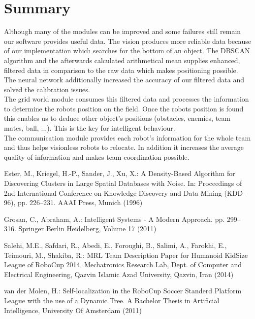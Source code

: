 \documentclass[lnicst,a4paper]{svmultln}
\begin{document}

\section{Summary}
Although many of the modules can be improved and some failures still remain our software provides useful data. The vision produces more reliable data because of our implementation which searches for the bottom of an object. The DBSCAN algorithm and the afterwards calculated arithmetical mean supplies enhanced, filtered data in comparison to the raw data which makes positioning possible. The neural network additionally increased the accuracy of our filtered data and solved the calibration issues.
\\
The grid world module consumes this filtered data and processes the information to determine the robots position on the field. Once the robots position is found this enables us to deduce other object's positions (obstacles, enemies, team mates, ball, ...). This is the key for intelligent behaviour.
\\
The communication module provides each robot's information for the whole team and thus helps visionless robots to relocate. In addition it increases the average quality of information and makes team coordination possible.





\begin{thebibliography}{5}

 Ester, M., Kriegel, H.-P., Sander, J., Xu, X.:
A Density-Based Algorithm for Discovering Clusters in Large Spatial Databases with Noise.
In: Proceedings of 2nd International Conference on Knowledge Discovery and Data Mining (KDD-96),
pp. 226--231. AAAI Press, Munich (1996)

 Grosan, C., Abraham, A.:
Intelligent Systems - A Modern Approach.
pp. 299--316. Springer Berlin Heidelberg, Volume 17 (2011)

 Salehi, M.E., Safdari, R., Abedi, E., Foroughi, B., Salimi, A., Farokhi, E., Teimouri, M., Shakiba, R.: MRL Team Description Paper for Humanoid KidSize League of RoboCup 2014. 
Mechatronics Research Lab, Dept. of Computer and Electrical Engineering,
Qazvin Islamic Azad University, Qazvin, Iran (2014)

 van der Molen, H.: Self-localization in the RoboCup Soccer Standerd Platform League with the use of a Dynamic Tree. A Bachelor Thesis in Artificial Intelligence, University Of Amsterdam (2011)


\end{thebibliography}
\end{document}
